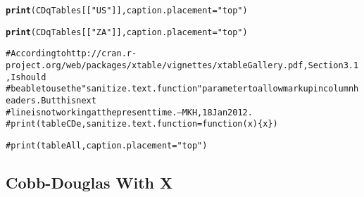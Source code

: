 \documentclass[preprint,authoryear,12pt]{elsarticle}\usepackage{graphicx, color}
\makeatletter
\newcommand{\hlfunctioncall}[1]{\textcolor[rgb]{0.501960784313725,0,0.329411764705882}{\textbf{#1}}}%
\newcommand{\hlstring}[1]{\textcolor[rgb]{0.6,0.6,1}{#1}}%
\newcommand{\hlcomment}[1]{\textcolor[rgb]{0.180392156862745,0.6,0.341176470588235}{#1}}%
\newenvironment{kframe}{%
 \def\at@end@of@kframe{}%
 \ifinner\ifhmode%
  \def\at@end@of@kframe{\end{minipage}}%
  \begin{minipage}{\columnwidth}%
 \fi\fi%
 \def\FrameCommand##1{\hskip\@totalleftmargin \hskip-\fboxsep
 \colorbox{shadecolor}{##1}\hskip-\fboxsep
     \hskip-\linewidth \hskip-\@totalleftmargin \hskip\columnwidth}%
 \MakeFramed {\advance\hsize-\width
   \@totalleftmargin\z@ \linewidth\hsize
   \@setminipage}}%
 {\par\unskip\endMakeFramed%
 \at@end@of@kframe}
\makeatother
\begin{document}
\begin{kframe}
\begin{alltt}
\hlfunctioncall{print}(CDqTables[[\hlstring{"US"}]], caption.placement=\hlstring{"top"})
\end{alltt}


{\ttfamily\noindent\bfseries\color{errorcolor}{Error: error in evaluating the argument 'x' in selecting a method for function 'print': Error: object 'CDqTables' not found}}\begin{alltt}
\hlfunctioncall{print}(CDqTables[[\hlstring{"ZA"}]], caption.placement=\hlstring{"top"})
\end{alltt}


{\ttfamily\noindent\bfseries\color{errorcolor}{Error: error in evaluating the argument 'x' in selecting a method for function 'print': Error: object 'CDqTables' not found}}\begin{alltt}
\hlcomment{# According to http://cran.r-project.org/web/packages/xtable/vignettes/xtableGallery.pdf, Section 3.1, I should }
\hlcomment{# be able to use the "sanitize.text.function" parameter to allow markup in column headers. But this next}
\hlcomment{# line is not working at the present time. --MKH, 18 Jan 2012.}
\hlcomment{# print(tableCDe, sanitize.text.function = function(x)\{x\})}

\hlcomment{#print(tableAll, caption.placement="top")}
\end{alltt}
\end{kframe}


\subsection{Cobb-Douglas With X}
\end{document}
